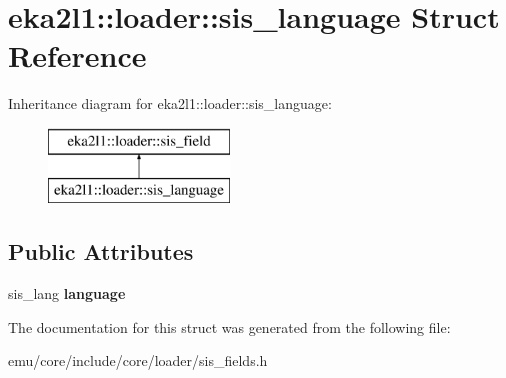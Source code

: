 \hypertarget{structeka2l1_1_1loader_1_1sis__language}{}\section{eka2l1\+:\+:loader\+:\+:sis\+\_\+language Struct Reference}
\label{structeka2l1_1_1loader_1_1sis__language}
Inheritance diagram for eka2l1\+:\+:loader\+:\+:sis\+\_\+language\+:\begin{figure}[H]
\begin{center}
\leavevmode
\includegraphics[height=2.000000cm]{structeka2l1_1_1loader_1_1sis__language}
\end{center}
\end{figure}
\subsection*{Public Attributes}
\begin{DoxyCompactItemize}
\item 
\mbox{\label{structeka2l1_1_1loader_1_1sis__language_afc8dc0327c572a91ee646f68f432ba82}} 
sis\+\_\+lang {\bfseries language}
\end{DoxyCompactItemize}


The documentation for this struct was generated from the following file\+:\begin{DoxyCompactItemize}
\item 
emu/core/include/core/loader/sis\+\_\+fields.\+h\end{DoxyCompactItemize}
